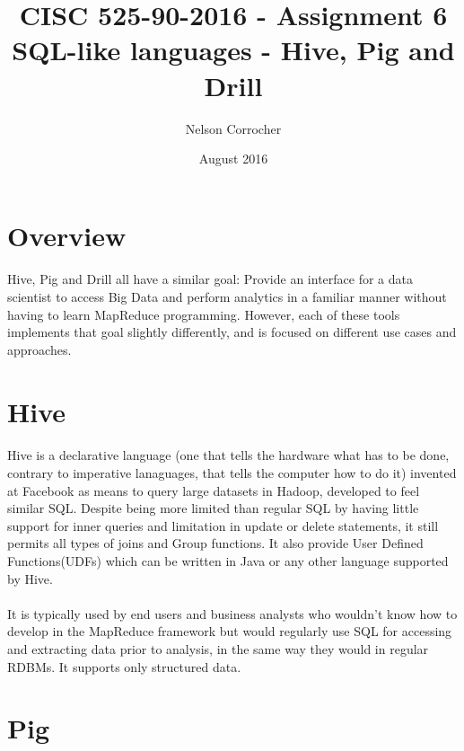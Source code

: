 
\title{CISC 525-90-2016 - Assignment 6\\ SQL-like languages - Hive, Pig and Drill}
\author{Nelson Corrocher}
\date{August 2016}

\maketitle
\section{Overview}
\paragraph{}Hive, Pig and Drill all have a similar goal:  Provide an interface for a data scientist to access Big Data and perform analytics in a familiar manner without having to learn MapReduce programming.  However, each of these tools implements that goal slightly differently, and is focused on different use cases and approaches. 

\section{Hive}  
\paragraph{}Hive is a declarative language (one that tells the hardware what has to be done, contrary to imperative lanaguages, that tells the computer how to do it) invented at Facebook as means to query large datasets in Hadoop, developed to feel similar SQL. Despite being more limited than regular SQL by having little support for inner queries and limitation in update or delete statements, it still permits all types of joins and Group functions. It also provide User Defined Functions(UDFs) which can be written in Java or any other language supported by Hive.

\paragraph{}It is typically used by end users and business analysts who wouldn't know how to develop in the MapReduce framework but would regularly use SQL for accessing and extracting data prior to analysis, in the same way they would in regular RDBMs. It supports only structured data.

\section{Pig}

